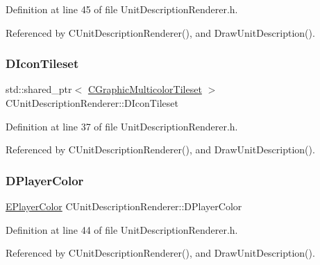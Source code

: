 Definition at line 45 of file Unit\+Description\+Renderer.\+h.



Referenced by C\+Unit\+Description\+Renderer(), and Draw\+Unit\+Description().

\hypertarget{classCUnitDescriptionRenderer_aadf76b5c018d76c3ff7bd8edc021d702}{}\label{classCUnitDescriptionRenderer_aadf76b5c018d76c3ff7bd8edc021d702} 
\subsubsection{\texorpdfstring{D\+Icon\+Tileset}{DIconTileset}}
{\footnotesize\ttfamily std\+::shared\+\_\+ptr$<$ \hyperlink{classCGraphicMulticolorTileset}{C\+Graphic\+Multicolor\+Tileset} $>$ C\+Unit\+Description\+Renderer\+::\+D\+Icon\+Tileset\hspace{0.3cm}{\ttfamily [protected]}}



Definition at line 37 of file Unit\+Description\+Renderer.\+h.



Referenced by C\+Unit\+Description\+Renderer(), and Draw\+Unit\+Description().

\hypertarget{classCUnitDescriptionRenderer_af2214b623c3b34eb4d6db9afc841b7a2}{}\label{classCUnitDescriptionRenderer_af2214b623c3b34eb4d6db9afc841b7a2} 
\subsubsection{\texorpdfstring{D\+Player\+Color}{DPlayerColor}}
{\footnotesize\ttfamily \hyperlink{GameDataTypes_8h_aafb0ca75933357ff28a6d7efbdd7602f}{E\+Player\+Color} C\+Unit\+Description\+Renderer\+::\+D\+Player\+Color\hspace{0.3cm}{\ttfamily [protected]}}



Definition at line 44 of file Unit\+Description\+Renderer.\+h.



Referenced by C\+Unit\+Description\+Renderer(), and Draw\+Unit\+Description().

